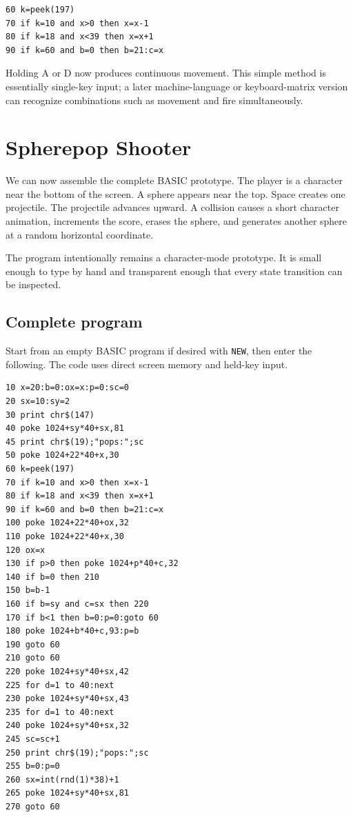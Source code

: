 \documentclass[11pt]{article}
\begin{document}
\begin{lstlisting}[style=basic]
60 k=peek(197)
70 if k=10 and x>0 then x=x-1
80 if k=18 and x<39 then x=x+1
90 if k=60 and b=0 then b=21:c=x
\end{lstlisting}

Holding A or D now produces continuous movement. This simple method is essentially single-key input; a later machine-language or keyboard-matrix version can recognize combinations such as movement and fire simultaneously.

\section{Spherepop Shooter}

We can now assemble the complete BASIC prototype. The player is a character near the bottom of the screen. A sphere appears near the top. Space creates one projectile. The projectile advances upward. A collision causes a short character animation, increments the score, erases the sphere, and generates another sphere at a random horizontal coordinate.

The program intentionally remains a character-mode prototype. It is small enough to type by hand and transparent enough that every state transition can be inspected.

\subsection{Complete program}

Start from an empty BASIC program if desired with \texttt{NEW}, then enter the following. The code uses direct screen memory and held-key input.

\begin{lstlisting}[style=basic]
10 x=20:b=0:ox=x:p=0:sc=0
20 sx=10:sy=2
30 print chr$(147)
40 poke 1024+sy*40+sx,81
45 print chr$(19);"pops:";sc
50 poke 1024+22*40+x,30
60 k=peek(197)
70 if k=10 and x>0 then x=x-1
80 if k=18 and x<39 then x=x+1
90 if k=60 and b=0 then b=21:c=x
100 poke 1024+22*40+ox,32
110 poke 1024+22*40+x,30
120 ox=x
130 if p>0 then poke 1024+p*40+c,32
140 if b=0 then 210
150 b=b-1
160 if b=sy and c=sx then 220
170 if b<1 then b=0:p=0:goto 60
180 poke 1024+b*40+c,93:p=b
190 goto 60
210 goto 60
220 poke 1024+sy*40+sx,42
225 for d=1 to 40:next
230 poke 1024+sy*40+sx,43
235 for d=1 to 40:next
240 poke 1024+sy*40+sx,32
245 sc=sc+1
250 print chr$(19);"pops:";sc
255 b=0:p=0
260 sx=int(rnd(1)*38)+1
265 poke 1024+sy*40+sx,81
270 goto 60
\end{lstlisting}
\end{document}
